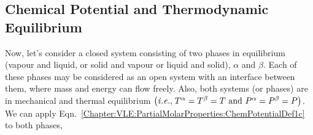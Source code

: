 \subsection{Chemical Potential and Thermodynamic Equilibrium}\label{Chapter:VLE:ChemPotThermEquil}

Now, let's consider a closed system consisting of two phases in equilibrium  (vapour and liquid, or solid and vapour or liquid and solid), $\alpha$ and $\beta$. Each of these phases may be considered as an open system with an interface between them, where mass and energy can flow freely. Also, both systems (or phases) are in mechanical and thermal equilibrium $\left({\it i.e., }\; T^{\alpha}=T^{\beta}=T\text{ and } P^{\alpha}=P^{\beta}=P\right)$. We can apply Eqn.~\ref{Chapter:VLE:PartialMolarProperties:ChemPotentialDef1c} to both phases,
  \begin{subequations}


\end{subequations}

